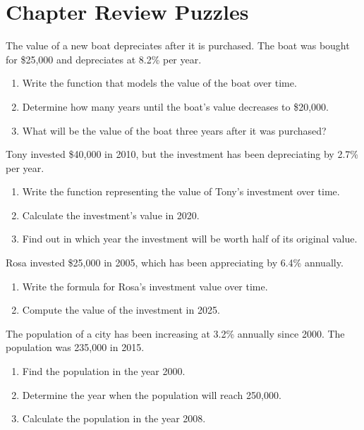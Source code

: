 \section{Chapter Review Puzzles}

\begin{puzzle}
    The value of a new boat depreciates after it is purchased. The boat was bought for \$25,000 and depreciates at 8.2\% per year.
    \begin{enumerate}
        \item Write the function that models the value of the boat over time.
        \item Determine how many years until the boat's value decreases to \$20,000.
        \item What will be the value of the boat three years after it was purchased?
    \end{enumerate}
\end{puzzle}

\begin{puzzle}
    Tony invested \$40,000 in 2010, but the investment has been depreciating by 2.7\% per year.
    \begin{enumerate}
        \item Write the function representing the value of Tony's investment over time.
        \item Calculate the investment's value in 2020.
        \item Find out in which year the investment will be worth half of its original value.
    \end{enumerate}
\end{puzzle}

\begin{puzzle}
    Rosa invested \$25,000 in 2005, which has been appreciating by 6.4\% annually.
    \begin{enumerate}
        \item Write the formula for Rosa's investment value over time.
        \item Compute the value of the investment in 2025.
    \end{enumerate}
\end{puzzle}

\begin{puzzle}
    The population of a city has been increasing at 3.2\% annually since 2000. The population was 235,000 in 2015.
    \begin{enumerate}
        \item Find the population in the year 2000.
        \item Determine the year when the population will reach 250,000.
        \item Calculate the population in the year 2008.
    \end{enumerate}
\end{puzzle}

